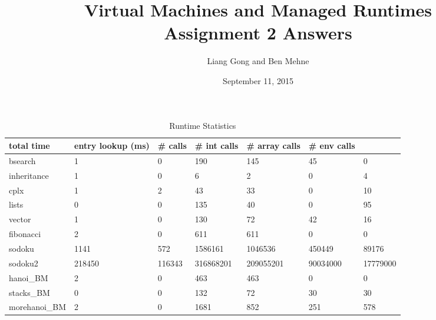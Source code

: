 \documentclass[notitlepage]{report}
\title{\vspace{-0.5in}Virtual Machines and Managed Runtimes \\ Assignment 2 Answers}
\date{\vspace{-0.5in}September 11, 2015}
\author{\vspace{-0.5in}Liang Gong and Ben Mehne\vspace{-0.5in}}
\begin{document}
\maketitle


\begin{table}[]
\centering
\caption{Runtime Statistics}
\label{statistics}
\begin{tabular}{lllllll}
\toprule
total time    & entry lookup (ms) & \# calls & \# int calls & \# array calls & \# env calls &          \\
\midrule
bsearch       & 1                     & 0            & 190              & 145                & 45               & 0        \\
inheritance   & 1                     & 0            & 6                & 2                  & 0                & 4        \\
cplx          & 1                     & 2            & 43               & 33                 & 0                & 10       \\
lists         & 0                     & 0            & 135              & 40                 & 0                & 95       \\
vector        & 1                     & 0            & 130              & 72                 & 42               & 16       \\
fibonacci     & 2                     & 0            & 611              & 611                & 0                & 0        \\
sodoku        & 1141                  & 572          & 1586161          & 1046536            & 450449           & 89176    \\
sodoku2       & 218450                & 116343       & 316868201        & 209055201          & 90034000         & 17779000 \\
hanoi\_BM     & 2                     & 0            & 463              & 463                & 0                & 0        \\
stacks\_BM    & 0                     & 0            & 132              & 72                 & 30               & 30       \\
morehanoi\_BM & 2                     & 0            & 1681             & 852                & 251              & 578      \\
\bottomrule 
\end{tabular}
\end{table}
\end{document}
